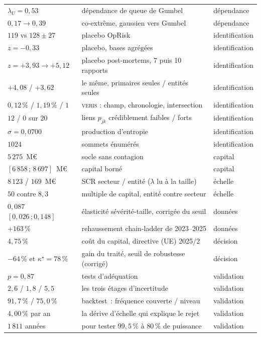 \documentclass[11pt,a4paper]{article}
\begin{document}
\begin{center}
\begin{tabular}{@{}l l l@{}}
$\lambda_U=0{,}53$ & dépendance de queue de Gumbel & dépendance \\
$0{,}17 \to 0{,}39$ & co-extrême, gaussien vers Gumbel & dépendance \\
$119$ vs $128\pm27$ & placebo OpRisk & identification \\
$z=-0{,}33$ & placebo, bases agrégées & identification \\
$z=+3{,}93 \to +5{,}12$ & placebo post-mortems, 7 puis 10 rapports & identification \\
$+4{,}08$ / $+3{,}62$ & le même, primaires seules / entités seules & identification \\
$0{,}12\,\%$ / $1{,}19\,\%$ / $1$ & \textsc{veris} : champ, chronologie, intersection & identification \\
$12$ / $0$ sur $20$ & liens $p_{jk}$ crédiblement faibles / forts & identification \\
$\sigma=0{,}0700$ & production d'entropie & identification \\
$1024$ & sommets énumérés & identification \\
$5\,275$~M\euro & socle sans contagion & capital \\
$[6\,858\,;\,8\,697]$~M\euro & capital borné & capital \\
$8\,123$ / $169$~M\euro & SCR secteur / entité ($\lambda$ lu à la taille) & échelle \\
$50$ contre $8{,}3$ & multiple de capital, entité contre secteur & échelle \\
$0{,}087$ $[0{,}026\,;0{,}148]$ & élasticité sévérité-taille, corrigée du seuil & données \\
$+163\,\%$ & rehaussement chain-ladder de 2023--2025 & données \\
$4{,}75\,\%$ & coût du capital, directive (UE) 2025/2 & décision \\
$-64\,\%$ et $\kappa^\star=78\,\%$ & \textcolor{accent}{gain du traité, seuil de robustesse (corrigé)} & décision \\
$p=0{,}87$ & tests d'adéquation & validation \\
$2{,}6$ / $1{,}8$ / $5{,}5$ & les trois étages d'incertitude & validation \\
$91{,}7\,\%$ / $75{,}0\,\%$ & backtest~: fréquence couverte / niveau & validation \\
$4{,}00\,\%$ par an & la dérive d'échelle qui explique le rejet & validation \\
$1\,811$ années & pour tester $99{,}5\,\%$ à $80\,\%$ de puissance & validation \\

\end{tabular}
\end{center}
\end{document}

